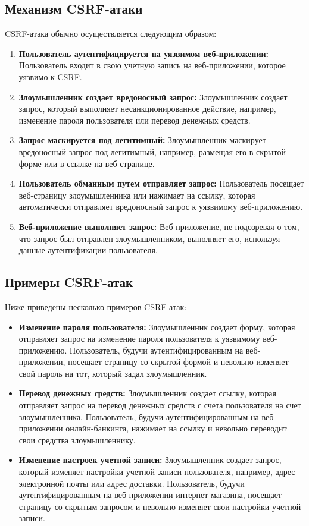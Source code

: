 \documentclass[a4paper,12pt]{diplom}
\begin{document}
	 \subsection{Механизм CSRF-атаки}
	 
	 CSRF-атака обычно осуществляется следующим образом:
	 
	 \begin{enumerate}[label=\arabic{enumi})]
	 	\item \textbf{Пользователь аутентифицируется на уязвимом веб-приложении:}  Пользователь входит в свою учетную запись на веб-приложении, которое уязвимо к CSRF.
		\item \textbf{Злоумышленник создает вредоносный запрос:}  Злоумышленник создает запрос, который выполняет несанкционированное действие, например, изменение пароля пользователя или перевод денежных средств.
	 	\item \textbf{Запрос маскируется под легитимный:}  Злоумышленник маскирует вредоносный запрос под легитимный, например, размещая его в скрытой форме или в ссылке на веб-странице.
	 	\item \textbf{Пользователь обманным путем отправляет запрос:}  Пользователь посещает веб-страницу злоумышленника или нажимает на ссылку, которая автоматически отправляет вредоносный запрос к уязвимому веб-приложению.
	 	\item \textbf{Веб-приложение выполняет запрос:}  Веб-приложение, не подозревая о том, что запрос был отправлен злоумышленником, выполняет его, используя данные аутентификации пользователя.
	\end{enumerate}
	 
	\subsection{Примеры CSRF-атак}
	 
	Ниже приведены несколько примеров CSRF-атак:
	 
	\begin{itemize}
		\item \textbf{Изменение пароля пользователя:}  Злоумышленник создает форму, которая отправляет запрос на изменение пароля пользователя к уязвимому веб-приложению. Пользователь, будучи аутентифицированным на веб-приложении, посещает страницу со скрытой формой и невольно изменяет свой пароль на тот, который задал злоумышленник.
		\item \textbf{Перевод денежных средств:}  Злоумышленник создает ссылку, которая отправляет запрос на перевод денежных средств с счета пользователя на счет злоумышленника. Пользователь, будучи аутентифицированным на веб-приложении онлайн-банкинга, нажимает на ссылку и невольно переводит свои средства злоумышленнику.
	 	\item \textbf{Изменение настроек учетной записи:}  Злоумышленник создает запрос, который изменяет настройки учетной записи пользователя, например, адрес электронной почты или адрес доставки. Пользователь, будучи аутентифицированным на веб-приложении интернет-магазина, посещает страницу со скрытым запросом и невольно изменяет свои настройки учетной записи.
	\end{itemize}
	 
\end{document}
